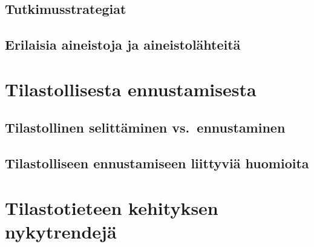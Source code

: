 \documentclass[
]{book}
\begin{document}
\hypertarget{alaluku102}{%
\section{Tutkimusstrategiat}\label{alaluku102}}

\hypertarget{alaluku103}{%
\section{Erilaisia aineistoja ja aineistolähteitä}\label{alaluku103}}

\hypertarget{luku11}{%
\chapter{Tilastollisesta ennustamisesta}\label{luku11}}

\hypertarget{alaluku111}{%
\section{Tilastollinen selittäminen vs.~ennustaminen}\label{alaluku111}}

\hypertarget{alaluku112}{%
\section{Tilastolliseen ennustamiseen liittyviä huomioita}\label{alaluku112}}

\hypertarget{luku12}{%
\chapter{Tilastotieteen kehityksen nykytrendejä}\label{luku12}}

  
\end{document}

